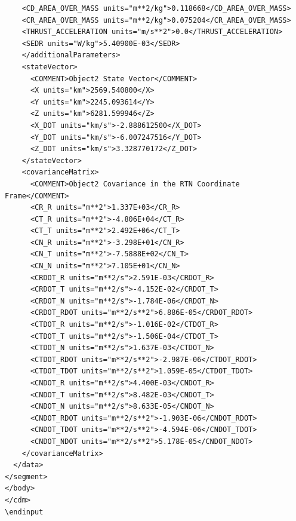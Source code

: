 \begin{lstlisting}
    <CD_AREA_OVER_MASS units="m**2/kg">0.118668</CD_AREA_OVER_MASS>
    <CR_AREA_OVER_MASS units="m**2/kg">0.075204</CR_AREA_OVER_MASS>
    <THRUST_ACCELERATION units="m/s**2">0.0</THRUST_ACCELERATION>
    <SEDR units="W/kg">5.40900E-03</SEDR>
    </additionalParameters>
    <stateVector>
      <COMMENT>Object2 State Vector</COMMENT>
      <X units="km">2569.540800</X>
      <Y units="km">2245.093614</Y>
      <Z units="km">6281.599946</Z>
      <X_DOT units="km/s">-2.888612500</X_DOT>
      <Y_DOT units="km/s">-6.007247516</Y_DOT>
      <Z_DOT units="km/s">3.328770172</Z_DOT>
    </stateVector>
    <covarianceMatrix>
      <COMMENT>Object2 Covariance in the RTN Coordinate Frame</COMMENT>
      <CR_R units="m**2">1.337E+03</CR_R>
      <CT_R units="m**2">-4.806E+04</CT_R>
      <CT_T units="m**2">2.492E+06</CT_T>
      <CN_R units="m**2">-3.298E+01</CN_R>
      <CN_T units="m**2">-7.5888E+02</CN_T>
      <CN_N units="m**2">7.105E+01</CN_N>
      <CRDOT_R units="m**2/s">2.591E-03</CRDOT_R>
      <CRDOT_T units="m**2/s">-4.152E-02</CRDOT_T>
      <CRDOT_N units="m**2/s">-1.784E-06</CRDOT_N>
      <CRDOT_RDOT units="m**2/s**2">6.886E-05</CRDOT_RDOT>
      <CTDOT_R units="m**2/s">-1.016E-02</CTDOT_R>
      <CTDOT_T units="m**2/s">-1.506E-04</CTDOT_T>
      <CTDOT_N units="m**2/s">1.637E-03</CTDOT_N>
      <CTDOT_RDOT units="m**2/s**2">-2.987E-06</CTDOT_RDOT>
      <CTDOT_TDOT units="m**2/s**2">1.059E-05</CTDOT_TDOT>
      <CNDOT_R units="m**2/s">4.400E-03</CNDOT_R>
      <CNDOT_T units="m**2/s">8.482E-03</CNDOT_T>
      <CNDOT_N units="m**2/s">8.633E-05</CNDOT_N>
      <CNDOT_RDOT units="m**2/s**2">-1.903E-06</CNDOT_RDOT>
      <CNDOT_TDOT units="m**2/s**2">-4.594E-06</CNDOT_TDOT>
      <CNDOT_NDOT units="m**2/s**2">5.178E-05</CNDOT_NDOT>
    </covarianceMatrix>
  </data>
</segment>
</body>
</cdm>
\endinput
\end{lstlisting}